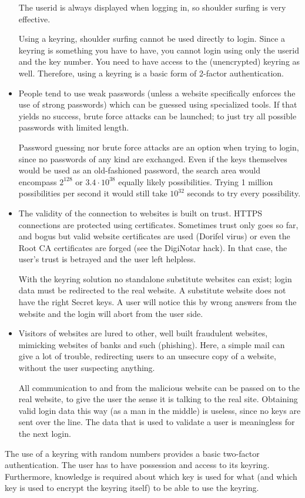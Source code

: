 \begin{itemize}
The userid is always displayed when logging in, so shoulder surfing is very effective.
\par
Using a keyring, shoulder surfing cannot be used directly to login.
Since a keyring is something you have to have, you cannot login using only the userid and the key number.
You need to have access to the (unencrypted) keyring as well.
Therefore, using a keyring is a basic form of 2-factor authentication.
\item People tend to use weak passwords (unless a website specifically enforces the use of strong passwords) which can be guessed using specialized tools.
If that yields no success, brute force attacks can be launched; to just try all possible passwords with limited length.
\par
Password guessing nor brute force attacks are an option when trying to login, since no passwords of any kind are exchanged.
Even if the keys themselves would be used as an old-fashioned password, the search area would encompass $2^{128}$ or $3.4\cdot 10^{38}$ equally likely possibilities.
Trying 1 million possibilities per second it would still take $10^{32}$ seconds to try every possibility.
\item The validity of the connection to websites is built on trust.
HTTPS connections are protected using certificates.
Sometimes trust only goes so far, and bogus but valid website certificates are used (Dorifel virus) or even the Root CA certificates are forged (see the DigiNotar hack).
In that case, the user's trust is betrayed and the user left helpless.
\par
With the keyring solution no standalone substitute websites can exist; login data must be redirected to the real website.
A substitute website does not have the right Secret keys.
A user will notice this by wrong answers from the website and the login will abort from the user side.
\item Visitors of websites are lured to other, well built fraudulent websites, mimicking websites of banks and such (phishing).
Here, a simple mail can give a lot of trouble, redirecting users to an unsecure copy of a website, without the user suspecting anything.
\par
All communication to and from the malicious website can be passed on to the real website, to give the user the sense it is talking to the real site.
Obtaining valid login data this way (as a man in the middle) is useless, since no keys are sent over the line.
The data that is used to validate a user is meaningless for the next login.
\end{itemize}
The use of a keyring with random numbers provides a basic two-factor authentication.
The user has to have possession and access to its keyring.
Furthermore, knowledge is required about which key is used for what
(and which key is used to encrypt the keyring itself)
to be able to use the keyring.

